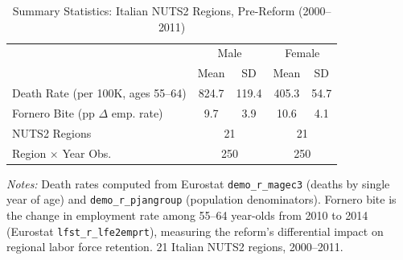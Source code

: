 \begin{table}[htbp]
\centering
\caption{Summary Statistics: Italian NUTS2 Regions, Pre-Reform (2000--2011)}
\label{tab:summary}
\begin{tabular}{lcccc}
\hline\hline
 & \multicolumn{2}{c}{Male} & \multicolumn{2}{c}{Female} \\
 & Mean & SD & Mean & SD \\
\hline
Death Rate (per 100K, ages 55--64) & 824.7 & 119.4 & 405.3 & 54.7 \\
Fornero Bite (pp $\Delta$ emp. rate) & 9.7 & 3.9 & 10.6 & 4.1 \\
NUTS2 Regions & \multicolumn{2}{c}{21} & \multicolumn{2}{c}{21} \\
Region $\times$ Year Obs. & \multicolumn{2}{c}{250} & \multicolumn{2}{c}{250} \\
\hline\hline
\end{tabular}
\begin{tablenotes}[flushleft]\small
\item \textit{Notes:} Death rates computed from Eurostat \texttt{demo\_r\_magec3} (deaths by
single year of age) and \texttt{demo\_r\_pjangroup} (population denominators). Fornero bite
is the change in employment rate among 55--64 year-olds from 2010 to 2014 (Eurostat
\texttt{lfst\_r\_lfe2emprt}), measuring the reform's differential impact on regional
labor force retention. 21 Italian NUTS2 regions, 2000--2011.
\end{tablenotes}
\end{table}
